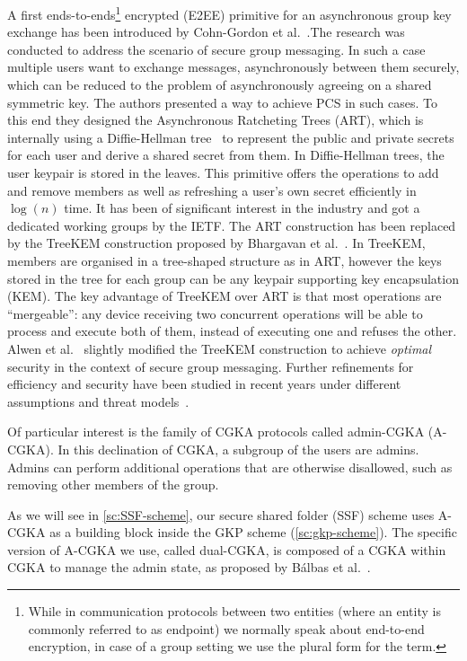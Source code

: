 A first ends-to-ends\footnote{While in communication protocols between two entities (where an entity is commonly referred to as endpoint) we normally speak about end-to-end encryption, in case of a group setting we use the plural form for the term.}
encrypted (E2EE) primitive for an asynchronous group key exchange 
has been introduced by Cohn-Gordon et al.~\cite{CCS:CCGMM18}.The research was conducted to address the scenario of secure group messaging.
In such a case multiple users want to exchange messages, asynchronously
between them securely, which can be reduced to the problem
of asynchronously agreeing on a shared symmetric key.
The authors presented a way to achieve PCS in such cases.
To this end they designed the Asynchronous Ratcheting Trees (ART),
which is internally using a Diffie-Hellman tree~\cite{10.1145/1368310.1368347} 
to represent the public and private secrets for each user
and derive a shared secret from them. In Diffie-Hellman
trees, the user keypair is stored in the leaves.
This primitive offers the operations to add and remove members
as well as refreshing a user's own secret efficiently in $\log(n)$ time.
It has been of significant interest in the industry and
got a dedicated working groups by the IETF.
The ART construction has been replaced by the TreeKEM
construction proposed by Bhargavan et al.~\cite{TreeKEM}.
In TreeKEM, members are organised in a tree-shaped structure
as in ART, however the keys stored in the tree for each group
can be any keypair supporting key encapsulation (KEM).
The key advantage of TreeKEM over ART is that
most operations are ``mergeable'':
any device receiving two
concurrent operations will be able to process and execute both of them,
instead of executing one and refuses the other.
Alwen et al.~\cite{C:ACDT20} slightly modified the TreeKEM construction
to achieve \textit{optimal} security in the context of
secure group messaging.
Further refinements for efficiency and security have 
been studied in recent years under different assumptions and threat models~\cite{TCC:ACJM20, SP:KPWKCCMYAP21, CCS:ACDT21, CCS:AHKM22, EC:AANKPPW22, C:AlwJosMul22, C:AlwMulTse23, IWSPA:KEONO23}.

Of particular interest is the family of CGKA protocols called admin-CGKA (A-CGKA).
In this declination of CGKA, a subgroup of the users are admins. 
Admins can perform additional operations that are otherwise disallowed, such as removing other members of the group.

As we will see in \cref{sc:SSF-scheme}, our secure shared folder (SSF) scheme uses A-CGKA as a building block
inside the GKP scheme (\cref{sc:gkp-scheme}).
The specific version of A-CGKA we use, called dual-CGKA, is composed of a CGKA within CGKA to manage the admin state, as proposed by
B{\'a}lbas et al.\!~\cite{USENIX:BalColVau23}.

